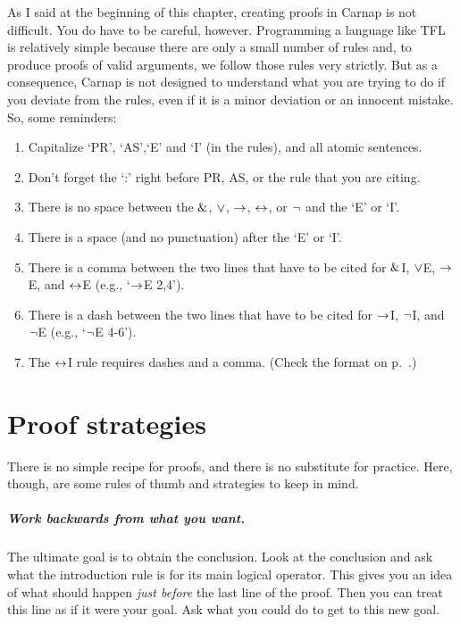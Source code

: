 As I said at the beginning of this chapter, creating proofs in Carnap is not difficult. You do have to be careful, however. Programming a language like TFL is relatively simple because there are only a small number of rules and, to produce proofs of valid arguments, we follow those rules very strictly. But as a consequence, Carnap is not designed to understand what you are trying to do if you deviate from the rules, even if it is a minor deviation or an innocent mistake. So, some reminders:
\begin{enumerate}
\itemsep-.3mm
	\item Capitalize `PR', `AS',`E' and `I' (in the rules), and all atomic sentences.
	\item Don't forget the `:' right before PR, AS, or the rule that you are citing. 
	\item There is no space between the $\mathbin{\&}$, $\vee$, $\rightarrow$, $\leftrightarrow$, or ${\neg}$ and the `E' or `I'.  
	\item There is a space (and no punctuation) after the `E' or `I'. 
	\item There is a comma between the two lines that have to be cited for $\mathbin{\&}$I, $\vee$E, $\rightarrow$E, and $\leftrightarrow$E (e.g., `$\rightarrow$E 2,4').
	\item There is a dash between the two lines that have to be cited for $\rightarrow$I, ${\neg}$I, and ${\neg}$E (e.g., `${\neg}$E 4-6').
	\item The $\leftrightarrow$I rule requires dashes and a comma. (Check the format on p.~\pageref{eiff-I}.)
\end{enumerate}




\chapter{Proof strategies}
There is no simple recipe for proofs, and there is no substitute for practice. Here, though, are some rules of thumb and strategies to keep in mind.

\paragraph{Work backwards from what you want.}
The ultimate goal is to obtain the conclusion. Look at the conclusion and ask what the introduction rule is for its main logical operator. This gives you an idea of what should happen \emph{just before} the last line of the proof. Then you can treat this line as if it were your goal. Ask what you could do to get to this new goal.

